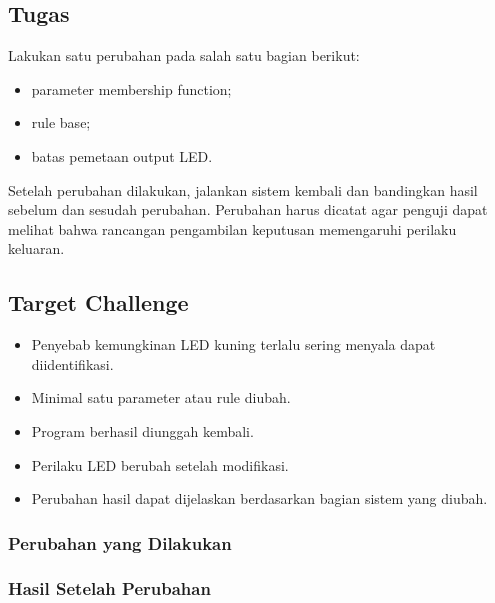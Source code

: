 \documentclass[12pt,a4paper]{article}
\begin{document}
\subsection*{Tugas}

Lakukan satu perubahan pada salah satu bagian berikut:
\begin{itemize}
    \item parameter membership function;
    \item rule base;
    \item batas pemetaan output LED.
\end{itemize}

Setelah perubahan dilakukan, jalankan sistem kembali dan bandingkan hasil sebelum dan sesudah perubahan. Perubahan harus dicatat agar penguji dapat melihat bahwa rancangan pengambilan keputusan memengaruhi perilaku keluaran.

\subsection*{Target Challenge}

\begin{itemize}
    \item [ ] Penyebab kemungkinan LED kuning terlalu sering menyala dapat diidentifikasi.
    \item [ ] Minimal satu parameter atau rule diubah.
    \item [ ] Program berhasil diunggah kembali.
    \item [ ] Perilaku LED berubah setelah modifikasi.
    \item [ ] Perubahan hasil dapat dijelaskan berdasarkan bagian sistem yang diubah.
\end{itemize}

\subsubsection*{Perubahan yang Dilakukan}

\noindent
\makebox[\textwidth]{\hrulefill}

\vspace{0.4cm}
\makebox[\textwidth]{\hrulefill}

\subsubsection*{Hasil Setelah Perubahan}

\noindent
\makebox[\textwidth]{\hrulefill}
\end{document}
